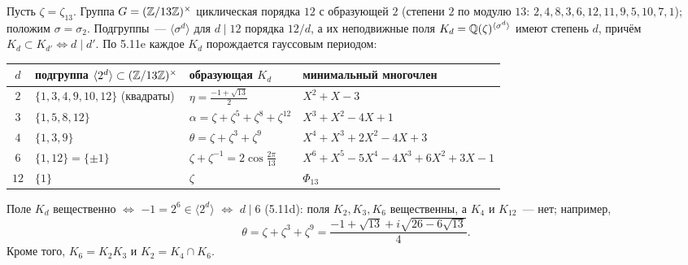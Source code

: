 \begin{example}[5.11i: $\Q(\zeta_{13})$]
Пусть $\zeta=\zeta_{13}$. Группа $G=(\mathbb Z/13\mathbb Z)^\times$ циклическая порядка $12$ с образующей $2$ (степени $2$ по модулю $13$:
$2,4,8,3,6,12,11,9,5,10,7,1$); положим $\sigma=\sigma_2$. Подгруппы~--- $\langle\sigma^d\rangle$ для $d\mid12$ порядка $12/d$, а
их неподвижные поля $K_d=\mathbb Q(\zeta)^{\langle\sigma^d\rangle}$ имеют степень $d$, причём $K_d\subset K_{d'}\iff d\mid d'$. По
5.11e каждое $K_d$ порождается гауссовым периодом:
\begin{center}\small
\renewcommand{\arraystretch}{1.2}
\begin{tabular}{@{}clll@{}}
\toprule
$d$ & подгруппа $\langle 2^d\rangle\subset(\mathbb Z/13\mathbb Z)^\times$ & образующая $K_d$ & минимальный многочлен\\
\midrule
$2$ & $\{1,3,4,9,10,12\}$ (квадраты) & $\eta=\frac{-1+\sqrt{13}}2$ & $X^2+X-3$\\
$3$ & $\{1,5,8,12\}$ & $\alpha=\zeta+\zeta^5+\zeta^8+\zeta^{12}$ & $X^3+X^2-4X+1$\\
$4$ & $\{1,3,9\}$ & $\theta=\zeta+\zeta^3+\zeta^9$ & $X^4+X^3+2X^2-4X+3$\\
$6$ & $\{1,12\}=\{\pm1\}$ & $\zeta+\zeta^{-1}=2\cos\frac{2\pi}{13}$ & $X^6+X^5-5X^4-4X^3+6X^2+3X-1$\\
$12$ & $\{1\}$ & $\zeta$ & $\Phi_{13}$\\
\bottomrule
\end{tabular}
\end{center}
Поле $K_d$ вещественно $\iff$ $-1=2^6\in\langle2^d\rangle$ $\iff$ $d\mid6$ (5.11d): поля $K_2,K_3,K_6$ вещественны, а $K_4$ и
$K_{12}$~--- нет; например,
\[
\theta=\zeta+\zeta^3+\zeta^9=\frac{-1+\sqrt{13}+i\sqrt{26-6\sqrt{13}}}4 .
\]
Кроме того, $K_6=K_2K_3$ и $K_2=K_4\cap K_6$.
\end{example}


